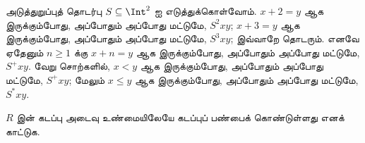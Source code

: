 \documentclass[../../../include/open-logic-section]{subfiles}
\begin{document}
\begin{ex}
அடுத்துறுப்புத் தொடர்பு $S \subseteq \Int^2$ ஐ எடுத்துக்கொள்வோம்.
$x + 2 =
y$ ஆக இருக்கும்போது, அப்போதும் அப்போது மட்டுமே, $S^2xy$;
$x + 3 = y$ ஆக இருக்கும்போது, அப்போதும் அப்போது மட்டுமே, $S^3xy$;
இவ்வாறே தொடரும். எனவே ஏதேனும் $n \geq 1$ க்கு $x + n = y$ ஆக
இருக்கும்போது, அப்போதும் அப்போது மட்டுமே, $S^+xy$.
வேறு சொற்களில், $x < y$ ஆக இருக்கும்போது, அப்போதும் அப்போது மட்டுமே,
$S^+xy$; மேலும் $x \le
y$ ஆக இருக்கும்போது, அப்போதும் அப்போது மட்டுமே, $S^*xy$.
\end{ex}

\begin{prob}
$R$ இன் கடப்பு அடைவு உண்மையிலேயே கடப்புப் பண்பைக் கொண்டுள்ளது எனக் காட்டுக.
\end{prob}
\end{document}
